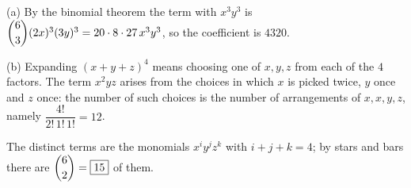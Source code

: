(a) By the binomial theorem the term with $x^3y^3$ is $\dbinom63(2x)^3(3y)^3=20\cdot8\cdot27\,x^3y^3$, so the coefficient is $\boxed{4320}$.

(b) Expanding $(x+y+z)^4$ means choosing one of $x,y,z$ from each of the $4$ factors. The term $x^2yz$ arises from the choices in which $x$ is picked twice, $y$ once and $z$ once: the number of such choices is the number of arrangements of $x,x,y,z$, namely $\dfrac{4!}{2!\,1!\,1!}=\boxed{12}$.

The distinct terms are the monomials $x^iy^jz^k$ with $i+j+k=4$; by stars and bars there are $\dbinom{6}{2}=\boxed{15}$ of them.
